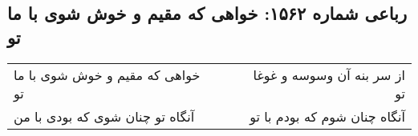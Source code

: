\begin{center}
\section*{رباعی شماره ۱۵۶۲: خواهی که مقیم و خوش شوی با ما تو}
\label{sec:1562}
\begin{longtable}{l p{0.5cm} r}
خواهی که مقیم و خوش شوی با ما تو
&&
از سر بنه آن وسوسه و غوغا تو
\\
آنگاه تو چنان شوی که بودی با من
&&
آنگاه چنان شوم که بودم با تو
\\
\end{longtable}
\end{center}

